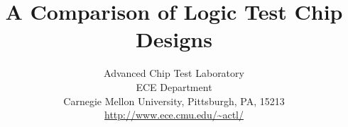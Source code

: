 \documentclass[journal]{IEEEtran}
\begin{document}
	
	
%
\title{A Comparison of Logic Test Chip Designs}
%
%
%


\author{Advanced Chip Test Laboratory \\ 
		ECE Department \\ 
		Carnegie Mellon University, Pittsburgh, PA, 15213 \\ 
		\url{http://www.ece.cmu.edu/~actl/}}


% 
%
\end{document}
